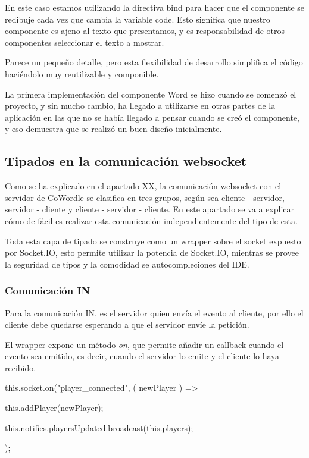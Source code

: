En este caso estamos utilizando la directiva bind para hacer que el componente se redibuje cada vez que cambia la variable code. Esto significa que nuestro componente es ajeno al texto que presentamos, y es responsabilidad de otros componentes seleccionar el texto a mostrar.

Parece un pequeño detalle, pero esta flexibilidad de desarrollo simplifica el código haciéndolo muy reutilizable y componible.

La primera implementación del componente Word se hizo cuando se comenzó el proyecto,  y sin mucho cambio, ha llegado a utilizarse en otras partes de la aplicación en las que no se había llegado a pensar cuando se creó el componente, y eso demuestra que se realizó un buen diseño inicialmente.

\subsection{Tipados en la comunicación websocket}
Como se ha explicado en el apartado XX, la comunicación websocket con el servidor de CoWordle se clasifica en tres grupos, según sea cliente - servidor, servidor - cliente y cliente - servidor - cliente. En este apartado se va a explicar cómo de fácil es realizar esta comunicación independientemente del tipo de esta.

Toda esta capa de tipado se construye como un wrapper sobre el socket expuesto por Socket.IO, esto permite utilizar la potencia de Socket.IO, mientras se provee la seguridad de tipos y la comodidad se autocompleciones del IDE.

\subsubsection{Comunicación IN}
Para la comunicación IN, es el servidor quien envía el evento al cliente, por ello el cliente debe quedarse esperando a que el servidor envíe la petición.

El wrapper expone un método \textit{on}, que permite añadir un callback cuando el evento sea emitido, es decir, cuando el servidor lo emite y el cliente lo haya recibido.

\begin{mytypescript}[float={!h},caption={Uso de eventos websocket IN.},label={alg:ws_in_usage}]
	this.socket.on("player_connected", ({ newPlayer }) => {
		this.addPlayer(newPlayer);
																								
		this.notifies.playersUpdated.broadcast(this.players);
	}); 
\end{mytypescript}

